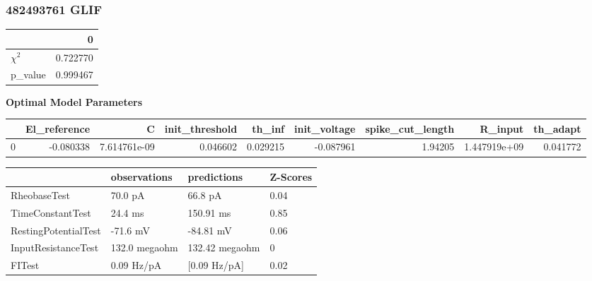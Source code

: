 \subsubsection{482493761 GLIF}\begin{tabular}{lr}
\toprule
{} &         0 \\
\midrule
$\chi^{2}$ &  0.722770 \\
p\_value    &  0.999467 \\
\bottomrule
\end{tabular}
\textbf{Optimal Model Parameters} \begin{tabular}{lrrrrrrrr}
\toprule
{} &  El\_reference &             C &  init\_threshold &    th\_inf &  init\_voltage &  spike\_cut\_length &       R\_input &  th\_adapt \\
\midrule
0 &     -0.080338 &  7.614761e-09 &        0.046602 &  0.029215 &     -0.087961 &           1.94205 &  1.447919e+09 &  0.041772 \\
\bottomrule
\end{tabular}
\begin{tabular}{llll}
\toprule
{} &   observations &     predictions & Z-Scores \\
\midrule
RheobaseTest         &        70.0 pA &         66.8 pA &     0.04 \\
TimeConstantTest     &        24.4 ms &       150.91 ms &     0.85 \\
RestingPotentialTest &       -71.6 mV &       -84.81 mV &     0.06 \\
InputResistanceTest  &  132.0 megaohm &  132.42 megaohm &        0 \\
FITest               &     0.09 Hz/pA &    [0.09 Hz/pA] &     0.02 \\
\bottomrule
\end{tabular}
